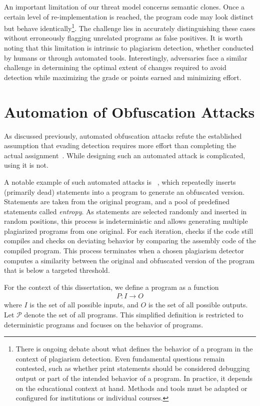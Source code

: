 An important limitation of our threat model concerns semantic clones. Once a certain level of re-implementation is reached, the program code may look distinct but behave identically\footnote{There is ongoing debate about what defines the behavior of a program in the context of plagiarism detection. Even fundamental questions remain contested, such as whether print statements should be considered debugging output or part of the intended behavior of a program. In practice, it depends on the educational context at hand. Methods and tools must be adapted or configured for institutions or individual courses.}. The challenge lies in accurately distinguishing these cases without erroneously flagging unrelated programs as false positives. It is worth noting that this limitation is intrinsic to plagiarism detection, whether conducted by humans or through automated tools.
Interestingly, adversaries face a similar challenge in determining the optimal extent of changes required to avoid detection while maximizing the grade or points earned and minimizing effort.
        
\section{Automation of Obfuscation Attacks}\label{sec:threatmodel-automation}
As discussed previously, automated obfuscation attacks refute the established assumption that evading detection requires more effort than completing the actual assignment~\cite{Joy1999, DevoreMcDonald2020}.
While designing such an automated attack is complicated, using it is not.

A notable example of such automated attacks is \mossad~\cite{DevoreMcDonald2020}, which repeatedly inserts (primarily dead) statements into a program to generate an obfuscated version. Statements are taken from the original program, and a pool of predefined statements called \textit{entropy}. As statements are selected randomly and inserted in random positions, this process is indeterministic and allows generating multiple plagiarized programs from one original. For each iteration, \mossad checks if the code still compiles and checks on deviating behavior by comparing the assembly code of the compiled program. This process terminates when a chosen plagiarism detector computes a similarity between the original and obfuscated version of the program that is below a targeted threshold.

\begin{theorem}[Program]\label{def:program}
For the context of this dissertation, we define a program as a function 
\begin{align*}
    P : I \rightarrow O
\end{align*}
where \(I\) is the set of all possible inputs, and \(O\) is the set of all possible outputs. Let \(\mathcal{P}\) denote the set of all programs. This simplified definition is restricted to deterministic programs and focuses on the behavior of programs.
\end{theorem}


